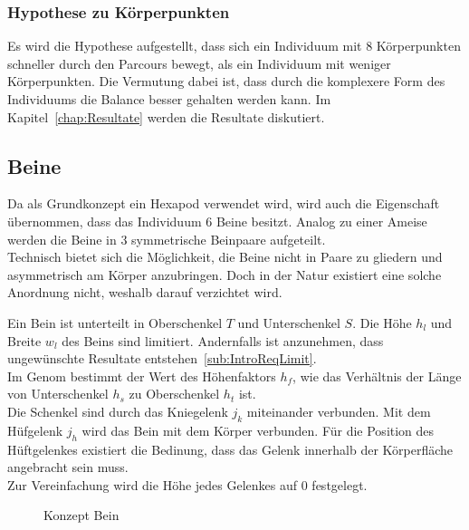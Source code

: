       \subsubsection{Hypothese zu Körperpunkten\label{subsub:hypoKp}}

        Es wird die Hypothese aufgestellt,
        dass sich ein Individuum mit 8 Körperpunkten schneller durch den Parcours bewegt,
        als ein Individuum mit weniger Körperpunkten.
        Die Vermutung dabei ist, dass durch die komplexere Form des Individuums die Balance besser gehalten werden kann.
        Im Kapitel~\ref{chap:Resultate} werden die Resultate diskutiert.

    \subsection{Beine\label{sub:Beine}}

      Da als Grundkonzept ein \gls{Hexapod} verwendet wird, wird auch die Eigenschaft übernommen,
      dass das Individuum 6 Beine besitzt.
      Analog zu einer Ameise werden die Beine in 3 symmetrische Beinpaare aufgeteilt.
      \\
      Technisch bietet sich die Möglichkeit, die Beine nicht in Paare zu gliedern und asymmetrisch am Körper anzubringen.
      Doch in der Natur existiert eine solche Anordnung nicht, weshalb darauf verzichtet wird.

      \smallskip

      Ein Bein ist unterteilt in Oberschenkel \(T\) und Unterschenkel \(S\).
      Die Höhe \(h_{l}\) und Breite \(w_{l}\) des Beins sind limitiert.
      Andernfalls ist anzunehmen, dass ungewünschte Resultate entstehen~\vref{sub:IntroReqLimit}.
      \\
      Im Genom bestimmt der Wert des Höhenfaktors \(h_{f}\),
      wie das Verhältnis der Länge von Unterschenkel \(h_{s}\) zu Oberschenkel \(h_{t}\) ist.
      \\
      Die Schenkel sind durch das Kniegelenk \(j_{k}\) miteinander verbunden.
      Mit dem Hüfgelenk \(j_{h}\) wird das Bein mit dem Körper verbunden.
      Für die Position des Hüftgelenkes existiert die Bedinung,
      dass das Gelenk innerhalb der Körperfläche angebracht sein muss.
      \\
      Zur Vereinfachung wird die Höhe jedes Gelenkes auf 0 festgelegt.

      \begin{figure}[H]
        \centering
        
        \caption{Konzept Bein\label{fig:conceptLeg}}
      \end{figure}


